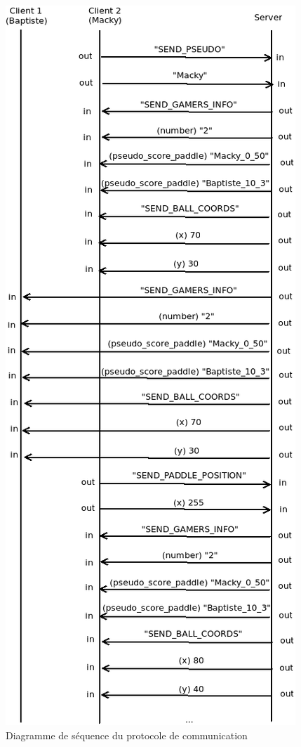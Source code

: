 \documentclass[a4paper,12pt]{article}
\begin{document}
\begin{figure}[!h]
  \begin{center}
    \includegraphics[scale=.45]{protocole.png}
  \end{center}
  \caption{Diagramme de séquence du protocole de communication}
\end{figure}
\end{document}
